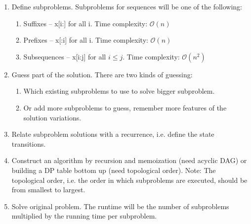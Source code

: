 \documentclass{article}
\newcommand{\bigO}{\mathcal{O}}
\begin{document}
    \begin{enumerate}
        \item Define subproblems. Subproblems for sequences will be one of the following:
        \begin{enumerate}
            \item Suffixes -- x[i:] for all i. Time complexity: $\bigO(n)$
            \item Prefixes -- x[:i] for all i. Time complexity: $\bigO(n)$
            \item Subsequences -- x[i:j] for all $i \leq j$. Time complexity: $\bigO(n^2)$
        \end{enumerate}
        
        \item Guess part of the solution. There are two kinds of guessing:
        \begin{enumerate}
            \item Which existing subproblems to use to solve bigger subproblem.
            \item Or add more subproblems to guess, remember more features of the solution variations.
        \end{enumerate}
        
        \item Relate subproblem solutions with a recurrence, i.e. define the state transitions.
        
        \item Construct an algorithm by recursion and memoization (need acyclic DAG) or building a DP table bottom up (need topological order). Note: The topological order, i.e. the order in which subproblems are executed, should be from smallest to largest.
        
        \item Solve original problem. The runtime will be the number of subproblems multiplied by the running time per subproblem.
    \end{enumerate}
    
\end{document}
